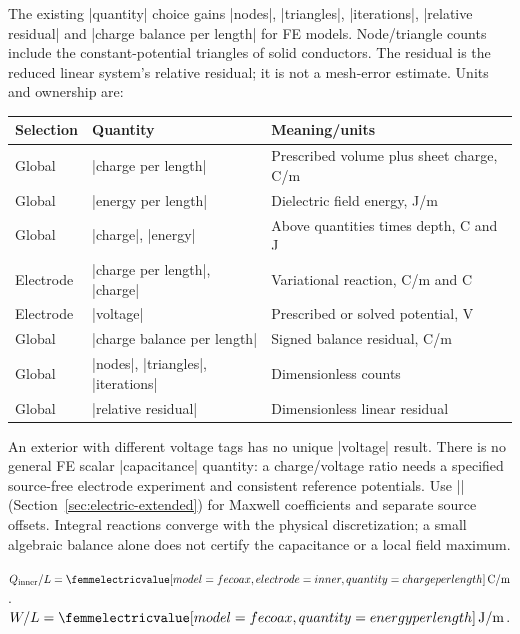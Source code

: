 The existing |quantity| choice gains |nodes|, |triangles|, |iterations|,
|relative residual| and |charge balance per length| for FE models.
Node/triangle counts include the constant-potential triangles of solid
conductors. The residual is the reduced linear system's relative residual;
it is not a mesh-error estimate. Units and ownership are:
\begin{center}\small
\begin{tabular}{lll}
Selection & Quantity & Meaning/units\\\hline
Global & |charge per length| & Prescribed volume plus sheet charge, C/m\\
Global & |energy per length| & Dielectric field energy, J/m\\
Global & |charge|, |energy| & Above quantities times depth, C and J\\
Electrode & |charge per length|, |charge| & Variational reaction, C/m and C\\
Electrode & |voltage| & Prescribed or solved potential, V\\
Global & |charge balance per length| & Signed balance residual, C/m\\
Global & |nodes|, |triangles|, |iterations| & Dimensionless counts\\
Global & |relative residual| & Dimensionless linear residual
\end{tabular}
\end{center}
An exterior with different voltage tags has no unique |voltage| result.
There is no general FE scalar |capacitance| quantity: a charge/voltage ratio
needs a specified source-free electrode experiment and consistent reference
potentials. Use |\femmelectricmatrix| (Section~\ref{sec:electric-extended})
for Maxwell coefficients and separate source offsets. Integral reactions converge
with the physical discretization; a small algebraic balance alone does not
certify the capacitance or a local field maximum.

\begin{codeexample}[width=0pt]
\end{codeexample}
\begin{codeexample}[width=0pt]
$Q_{\rm inner}/L=\femmelectricvalue[model=fe coax,electrode=inner,
  quantity=charge per length]\,\mathrm{C/m}$.
\quad
$W/L=\femmelectricvalue[model=fe coax,quantity=energy per length]\,\mathrm{J/m}$.
\end{codeexample}

